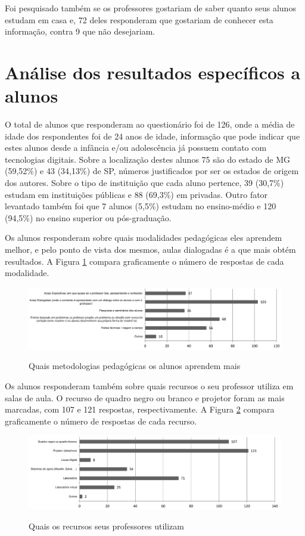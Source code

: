 Foi pesquisado também se os professores gostariam de saber quanto seus alunos estudam em casa e, 72 deles responderam que gostariam de conhecer esta informação, contra 9 que não desejariam.

\section{Análise dos resultados específicos a alunos}

O total de alunos que responderam ao questionário foi de 126, onde a média de idade dos respondentes foi de 24 anos de idade, informação que pode indicar que estes alunos desde a infância e/ou adolescência já possuem contato com tecnologias digitais. Sobre a localização destes alunos 75 são do estado de MG (59,52\%) e 43 (34,13\%) de SP, números justificados por ser os estados de origem dos autores. Sobre o tipo de instituição que cada aluno pertence, 39 (30,7\%) estudam em instituições públicas e 88 (69,3\%) em privadas. Outro fator levantado também foi que 7 alunos (5,5\%) estudam no ensino-médio e 120 (94,5\%) no ensino superior ou pós-graduação.

Os alunos responderam sobre quais modalidades pedagógicas eles aprendem melhor, e pelo ponto de vista dos mesmos, aulas dialogadas é a que mais obtém resultados. A Figura \ref{fig:metodologia_alunos} compara graficamente o número de respostas de cada modalidade.

\begin{figure}[!h]
\centering
\caption{Quais metodologias pedagógicas os alunos aprendem mais}
\includegraphics[width=1.0\textwidth]{pdfs/alunos-professores/pesquisa-alunos-modalidade-pedagogicas.pdf} 
\label{fig:metodologia_alunos} 
\end{figure}

Os alunos responderam também sobre quais recursos o seu professor utiliza em salas de aula. O recurso de quadro negro ou branco e projetor foram as mais marcadas, com 107 e 121 respostas, respectivamente. A Figura \ref{fig:recursos_professores} compara graficamente o número de respostas de cada recurso.

\begin{figure}[!h]
\centering
\caption{Quais os recursos seus professores utilizam}
\includegraphics[width=1.0\textwidth]{pdfs/alunos-professores/pesquisa-alunos-recursos-que-seu-professor.pdf} 
\label{fig:recursos_professores} 
\end{figure}

